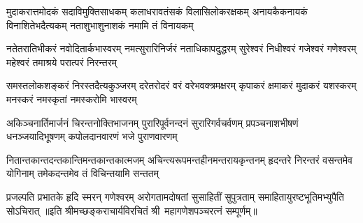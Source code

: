 
\fourlineindentedshloka
{मुदाकरात्तमोदकं सदाविमुक्तिसाधकम्}
{कलाधरावतंसकं विलासिलोकरक्षकम्}
{अनायकैकनायकं विनाशितेभदैत्यकम्}
{नताशुभाशुनाशकं नमामि तं विनायकम्}

\fourlineindentedshloka
{नतेतरातिभीकरं नवोदितार्कभास्वरम्}
{नमत्सुरारिनिर्जरं नताधिकापदुद्धरम्}
{सुरेश्वरं निधीश्वरं गजेश्वरं गणेश्वरम्}
{महेश्वरं तमाश्रये परात्परं निरन्तरम्}

\fourlineindentedshloka
{समस्तलोकशङ्करं निरस्तदैत्यकुञ्जरम्}
{दरेतरोदरं वरं वरेभवक्त्रमक्षरम्}
{कृपाकरं क्षमाकरं मुदाकरं यशस्करम्}
{मनस्करं नमस्कृतां नमस्करोमि भास्वरम्}

\fourlineindentedshloka
{अकिञ्चनार्तिमार्जनं चिरन्तनोक्तिभाजनम्}
{पुरारिपूर्वनन्दनं सुरारिगर्वचर्वणम्}
{प्रपञ्चनाशभीषणं धनञ्जयादिभूषणम्}
{कपोलदानवारणं भजे पुराणवारणम्}

\fourlineindentedshloka
{नितान्तकान्तदन्तकान्तिमन्तकान्तकात्मजम्}
{अचिन्त्यरूपमन्तहीनमन्तरायकृन्तनम्}
{हृदन्तरे निरन्तरं वसन्तमेव योगिनाम्}
{तमेकदन्तमेव तं विचिन्तयामि सन्ततम्}

{प्रजल्पति प्रभातके हृदि स्मरन् गणेश्वरम्}
{अरोगतामदोषतां सुसाहितीं सुपुत्रताम्}
{समाहितायुरष्टभूतिमभ्युपैति सोऽचिरात्}
॥इति श्रीमच्छङ्कराचार्यविरचितं श्री~महागणेशपञ्चरत्नं सम्पूर्णम्॥